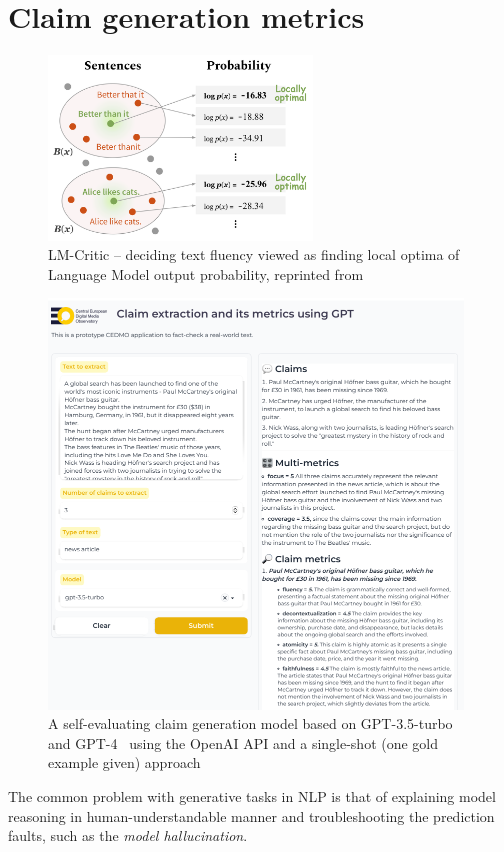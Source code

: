 \section{Claim generation metrics}
\label{metrics}

\begin{figure}
    \includegraphics[width=7cm]{fig/lm_critics.png}
    \caption{\textsf{LM-Critic} -- deciding text fluency viewed as finding local optima of Language Model output probability, reprinted from~\cite{yasunaga-etal-2021-lm}}
    \label{fig:lmcritic}
\end{figure}
\label{sec:metrics}

\begin{figure}
    \includegraphics[width=11cm]{fig/gptext.pdf}
    \caption{A self-evaluating claim generation model based on GPT-3.5-turbo and GPT-4~\cite{gpt4} using the \textsf{OpenAI API} and a single-shot (one gold example given) approach}
    \label{fig:gptext}
\end{figure}
\label{sec:metrics}
The common problem with generative tasks in NLP is that of explaining model reasoning in human-understandable manner and troubleshooting the prediction faults, such as the \textit{model hallucination}.

